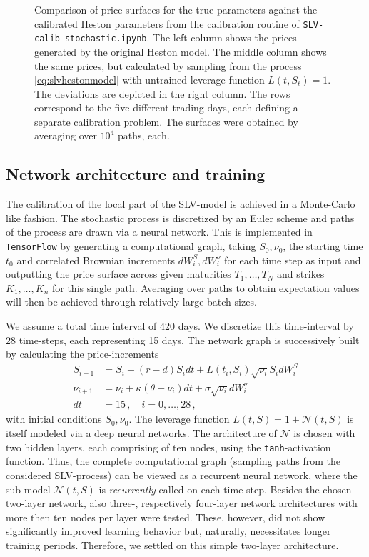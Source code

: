 \documentclass[
a4paper,     %
12pt           %
]{scrartcl}  %
\numberwithin{equation}{section}
\begin{document}
\begin{figure}
\begin{minipage}[Ausrichtung]{0.329\textwidth}
	\end{minipage}
	\caption{Comparison of price surfaces for the true parameters against the calibrated Heston parameters from the calibration routine of \texttt{SLV-calib-stochastic.ipynb}. The left column shows the prices generated by the original Heston model. The middle column shows the same prices, but calculated by sampling from the process \eqref{eq:slvhestonmodel} with untrained leverage function $L(t,S_t) = 1$. The deviations are depicted in the right column. The rows correspond to the five different trading days, each defining a separate calibration problem. The surfaces were obtained by averaging over $10^4$ paths, each.}
	\label{fig:pricesurf_comparison_untrained}
\end{figure}


\subsection{Network architecture and training}\label{sec:architecture_rec}


The calibration of the local part of the SLV-model is achieved in a Monte-Carlo like fashion. The stochastic process is discretized by an Euler scheme and paths of the process are drawn via a neural network. This is implemented in \texttt{TensorFlow} by generating a computational graph, taking $S_0,\nu_0$, the starting time $t_0$ and correlated Brownian increments $dW^S_i,dW^\nu_i$ for each time step as input and outputting the price surface across given maturities $T_1,\dots, T_N$ and strikes $K_1, \dots, K_n$ for this single path. Averaging over paths to obtain expectation values will then be achieved through relatively large batch-sizes.

We assume a total time interval of 420 days. We discretize this time-interval by 28 time-steps, each representing 15 days. The network graph is successively built by calculating the price-increments
\begin{align}
	S_{i+1} &= S_i + (r - d)S_idt + L(t_i,S_i)\sqrt{\nu_i}S_idW^S_i \\
	\nu_{i+1} &= \nu_i + \kappa(\theta - \nu_i)dt + \sigma \sqrt{\nu_i}dW^\nu_i \\
	dt &= 15\,,\quad i=0,\dots,28 \,,
\end{align}
with initial conditions $S_0,\nu_0$. The leverage function $L(t,S) = 1+\mathcal{N}(t,S)$ is itself modeled via a deep neural networks. The architecture of $\mathcal{N}$ is chosen with two hidden layers, each comprising of ten nodes, using the \texttt{tanh}-activation function. Thus, the complete computational graph (sampling paths from the considered SLV-process) can be viewed as a recurrent neural network, where the sub-model $\mathcal{N}(t,S)$ is \textit{recurrently} called on each time-step. Besides the chosen two-layer network, also three-, respectively four-layer network architectures with more then ten nodes per layer were tested. These, however, did not show significantly improved learning behavior but, naturally, necessitates longer training periods. Therefore, we settled on this simple two-layer architecture.
\end{document}
